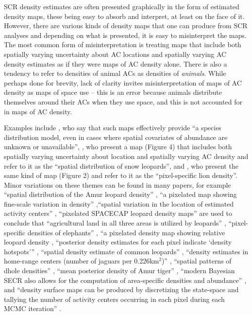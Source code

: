 \documentclass[useAMS,usenatbib,referee]{biom}
\begin{document}
SCR density estimates are often presented graphically in the form of estimated density maps, these being easy to absorb and interpret, at least on the face of it.  However, there are various kinds of density maps that one can produce from SCR analyses and depending on what is presented, it is easy to misinterpret the maps. The most common form of misinterpretation is treating maps that include both spatially varying uncertainty about AC locations and spatially varying AC density estimates as if they were maps of AC density alone. There is also a tendency to refer to densities of animal ACs as densities of {\it animals}. While perhaps done for brevity, lack of clarity invites misinterpretation of maps of AC density as maps of space use -- this is an error because animals distribute themselves around their ACs when they use space, and this is not accounted for in maps of AC density. 

Examples include \cite{Dorazio+Karanth:17}, who say that such maps effectively provide  ``a species distribution model, even in cases where spatial covariates of abundance are unknown or unavailable'', \cite{Alexander+al:15}, who present a map (Figure 4) that includes both spatially varying uncertainty about location and spatially varying AC density and refer to it as the ``spatial distribution of snow leopards'', and \cite{Elliot+Gopalaswamy:16}, who present the same kind of map (Figure 2) and refer to it as the ``pixel-specific lion density''. Minor variations on these themes can be found in many papers, for example ``spatial distribution of the Amur leopard density'' \citep{Qi2015}, ``a pixelated map showing fine-scale variation in density'' \citep{Fouche2020},``spatial variation in the location of estimated activity centers'' \citep{Blanc2013}, ``pixelated SPACECAP leopard density maps'' are used to conclude that ``agricultural land in all three areas is utilized by leopards'' \citep{Devens2021}, ``pixel-specific densities of elephants'' \citep{Goswami2019}, ``a pixelated density map showing relative leopard density \citep{Kandel2020}, ``posterior density estimates for each pixel indicate `density hotspots''' \citep{samarasinghe2022evidence}, ``spatial density estimate of common leopards'' \citep{Goldberg2015}, ``density estimates in home-range centers (number of jaguars per 0.226km$^2$)'' \citep{Lavariega2020}, ``spatial patterns of dhole densities'' \citep{Srivathsa2021}, ``mean posterior density of Amur tiger'' \citep{Xiao2016}, ``modern Bayesian SECR also allows for the computation of area-specific densities and abundance'' \citep{braczkowski2022spatially}, and ``density surface maps can be produced by discretizing the state-space and tallying the number of activity centers occurring in each pixel during each MCMC iteration'' \citep{Chandler+Royle:13}.
\end{document}
